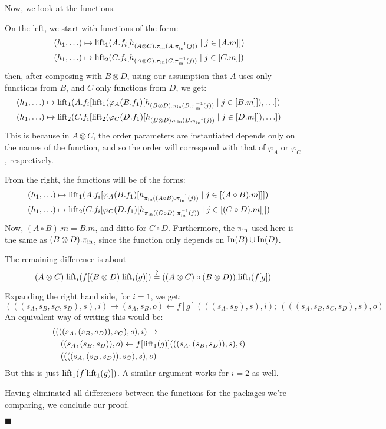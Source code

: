 \begin{lemma}
    Now, we look at the functions.

    On the left, we start with functions of the form:
    $$
    \begin{aligned}
    &(h_1, \ldots) \mapsto
    \text{lift}_1(A.f_i[h_{(A \otimes C).\pi_{\text{in}}(A.\pi_{\text{in}}^{-1}(j))}\mid j \in [A.m]])\cr
    &(h_1, \ldots) \mapsto
    \text{lift}_2(C.f_i[h_{(A \otimes C).\pi_{\text{in}}(C.\pi_{\text{in}}^{-1}(j))}\mid j \in [C.m]])\cr
    \end{aligned}
    $$
    then, after composing with $B \otimes D$, using our assumption
    that $A$ uses only functions from $B$, and $C$ only functions from $D$,
    we get:
    $$
    \begin{aligned}
    &(h_1, \ldots) \mapsto
    \text{lift}_1(A.f_i[\text{lift}_1(\varphi_{A}(B.f_1)[h_{(B \otimes D).\pi_{\text{in}}(B.\pi_{\text{in}}^{-1}(j))}\mid j \in [B.m]]), \ldots])\cr
    &(h_1, \ldots) \mapsto
    \text{lift}_2(C.f_i[\text{lift}_2(\varphi_{C}(D.f_1)[h_{(B \otimes D).\pi_{\text{in}}(B.\pi_{\text{in}}^{-1}(j))}\mid j \in [D.m]]), \ldots])\cr
    \end{aligned}
    $$
    This is because in $A \otimes C$, the order parameters are instantiated
    depends only on the names of the function, and so the order
    will correspond with that of $\varphi_A$ or $\varphi_C$, respectively.

    From the right, the functions will be of the forms:
    $$
    \begin{aligned}
    &(h_1, \ldots) \mapsto \text{lift}_1(A.f_i[\varphi_A(B.f_1)[h_{\pi_{\text{in}}((A \circ B).\pi_{\text{in}}^{-1}(j))}\mid j \in [(A \circ B).m]]])\cr
    &(h_1, \ldots) \mapsto \text{lift}_2(C.f_i[\varphi_C(D.f_1)[h_{\pi_{\text{in}}((C \circ D).\pi_{\text{in}}^{-1}(j))}\mid j \in [(C \circ D).m]]])\cr
    \end{aligned}
    $$
    Now, $(A \circ B).m = B.m$, and ditto for $C \circ D$.
    Furthermore, the $\pi_{\text{in}}$ used here is the same as $(B \otimes D).\pi_{\text{in}}$,
    since the function only depends on $\text{In}(B) \cup \text{In}(D)$.

    The remaining difference is about
    $$
    (A \otimes C).\text{lift}_i(f[(B \otimes D).\text{lift}_i(g)])
    \stackrel{?}{=}
    ((A \otimes C) \circ (B \otimes D)).\text{lift}_i(f[g])
    $$

    Expanding the right hand side, for $i = 1$, we get:
    $$
    (((s_A, s_B, s_C, s_D), s), i) \mapsto (s_A, s_B, o) \gets f[g](((s_A, s_B), s), i);\ (((s_A, s_B, s_C, s_D), s), o)
    $$
    An equivalent way of writing this would be:
    $$
    \begin{aligned}
    &((((s_A, (s_B, s_D)), s_C), s), i) \mapsto\cr
    &\quad ((s_A, (s_B, s_D)), o) \gets f[\text{lift}_1(g)](((s_A, (s_B, s_D)), s), i)\cr
    &\quad ((((s_A, (s_B, s_D)), s_C), s), o)
    \end{aligned}
    $$
    But this is just $\text{lift}_1(f[\text{lift}_1(g)])$.
    A similar argument works for $i = 2$ as well.

    Having eliminated all differences between the functions for the packages
    we're comparing, we conclude our proof.

    $\blacksquare$
\end{lemma}

